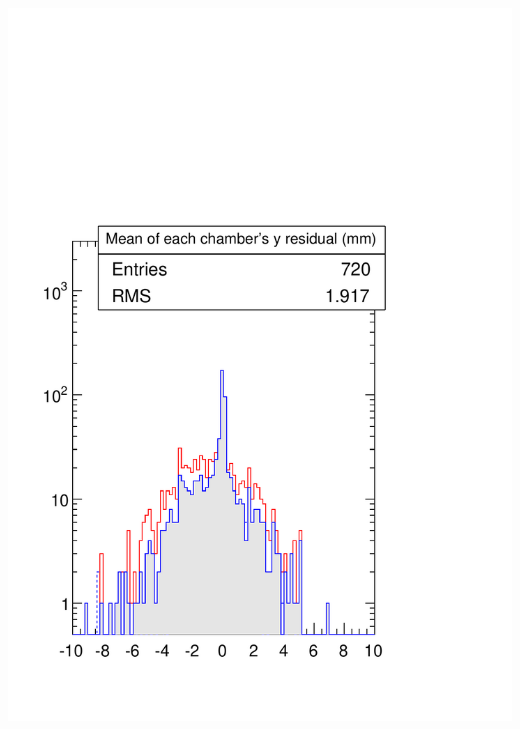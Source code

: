 \documentclass[compress]{beamer}
\begin{document}
\begin{frame}
\begin{columns}
\includegraphics[width=\linewidth]{S156_plots/sanitycheck_y.pdf}
\end{columns}

\end{frame}
\end{document}

